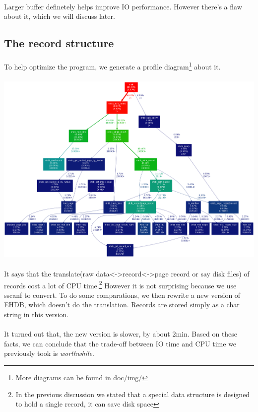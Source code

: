 \documentclass[a4paper, 12pt]{article}
\begin{document}
        \paragraph{}
            Larger buffer definetely helps improve IO performance. However there's a flaw about it, which we will discuss later.
    \subsection{The record structure}
        \paragraph{}
            To help optimize the program, we generate a profile diagram\footnote{More diagrams can be found in doc/img/} about it.
        \paragraph{} \includegraphics[scale=0.3]{img/proff_big_record.png}
        \paragraph{}
            It says that the translate(raw data<->record<->page record or say disk files) of records cost a lot of CPU time.\footnote{In the previous discussion we stated that a special data structure is designed to hold a single record, it can save disk space} However it is not surprising because we use sscanf to convert. To do some comparations, we then rewrite a new version of EHDB, which doesn't do the translation. Records are stored simply as a char string in this version.
        \paragraph{}
            It turned out that, the new version is slower, by about 2min. Based on these facts, we can conclude that the trade-off between IO time and CPU time we previously took is \emph{worthwhile}.
\end{document}
